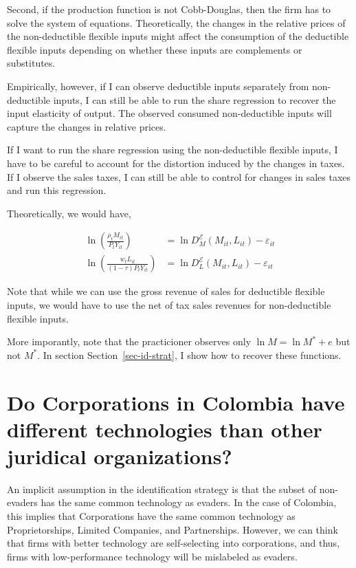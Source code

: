 \documentclass[
  12pt]{article}
\theoremstyle{definition}
\theoremstyle{remark}
\begin{document}
Second, if the production function is not Cobb-Douglas, then the firm
has to solve the system of equations. Theoretically, the changes in the
relative prices of the non-deductible flexible inputs might affect the
consumption of the deductible flexible inputs depending on whether these
inputs are complements or substitutes.

Empirically, however, if I can observe deductible inputs separately from
non-deductible inputs, I can still be able to run the share regression
to recover the input elasticity of output. The observed consumed
non-deductible inputs will capture the changes in relative prices.

If I want to run the share regression using the non-deductible flexible
inputs, I have to be careful to account for the distortion induced by
the changes in taxes. If I observe the sales taxes, I can still be able
to control for changes in sales taxes and run this regression.

Theoretically, we would have,

\[
\begin{aligned}
    \ln\left(\frac{\rho_{t}M_{it}}{P_tY_{it}}\right)&=\ln D^{\mathcal{E}}_M(M_{it}, L_{it})-\varepsilon_{it} \\
    \ln\left(\frac{w_{t}L_{it}}{(1-\tau)P_tY_{it}}\right)&=\ln D^{\mathcal{E}}_L(M_{it}, L_{it})-\varepsilon_{it}
\end{aligned}
\]

Note that while we can use the gross revenue of sales for deductible
flexible inputs, we would have to use the net of tax sales revenues for
non-deductible flexible inputs.

More imporantly, note that the practicioner observes only
\(\ln M=\ln M^*+e\) but not \(M^*\). In section
Section~\ref{sec-id-strat}, I show how to recover these functions.

\section{Do Corporations in Colombia have different technologies than
other juridical
organizations?}\label{do-corporations-in-colombia-have-different-technologies-than-other-juridical-organizations}

An implicit assumption in the identification strategy is that the subset
of non-evaders has the same common technology as evaders. In the case of
Colombia, this implies that Corporations have the same common technology
as Proprietorships, Limited Companies, and Partnerships. However, we can
think that firms with better technology are self-selecting into
corporations, and thus, firms with low-performance technology will be
mislabeled as evaders.
\end{document}
